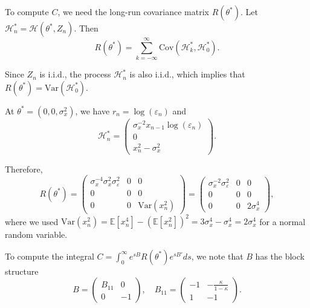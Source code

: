 \documentclass[11pt]{article}
\begin{document}
To compute $C$, we need the long-run covariance matrix $R(\theta^*)$. Let $\mathcal{H}^*_n = \mathcal{H}(\theta^*, Z_n)$. Then
\begin{equation}
    R(\theta^*) = \sum_{k=-\infty}^{\infty} \text{Cov}\left(\mathcal{H}^*_k, \mathcal{H}^*_0\right).
\end{equation}

Since $Z_n$ is i.i.d., the process $\mathcal{H}^*_n$ is also i.i.d., which implies that $R(\theta^*) = \text{Var}(\mathcal{H}^*_0)$. 

At $\theta^* = (0, 0, \sigma^2_x)$, we have $r_n = \log(\varepsilon_n)$ and
\begin{equation}
    \mathcal{H}^*_n = 
    \begin{pmatrix}
        \sigma^{-2}_x x_{n-1} \log(\varepsilon_n) \\
        0 \\
        x_n^2 - \sigma^2_x
    \end{pmatrix}.
\end{equation}

Therefore,
\begin{equation}
    R(\theta^*) = 
    \begin{pmatrix}
        \sigma^{-4}_x \sigma^2_x \sigma^2_\varepsilon & 0 & 0 \\
        0 & 0 & 0 \\
        0 & 0 & \text{Var}(x_n^2)
    \end{pmatrix} =
    \begin{pmatrix}
        \sigma^{-2}_x \sigma^2_\varepsilon & 0 & 0 \\
        0 & 0 & 0 \\
        0 & 0 & 2\sigma^4_x
    \end{pmatrix},
\end{equation}
where we used $\text{Var}(x_n^2) = \mathbb{E}[x_n^4] - (\mathbb{E}[x_n^2])^2 = 3\sigma^4_x - \sigma^4_x = 2\sigma^4_x$ for a normal random variable.

To compute the integral $C = \int_0^\infty e^{sB} R(\theta^*) e^{sB'} ds$, we note that $B$ has the block structure
\begin{equation}
    B = \begin{pmatrix}
        B_{11} & 0 \\
        0 & -1
    \end{pmatrix}, \quad B_{11} = \begin{pmatrix}
        -1 & -\frac{\kappa}{1-\kappa} \\
        1 & -1
    \end{pmatrix}.
\end{equation}
\end{document}
